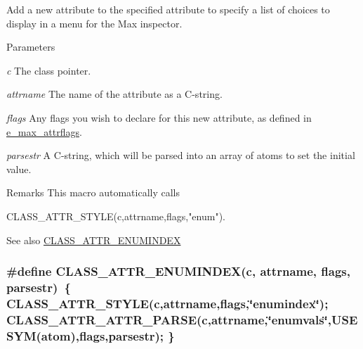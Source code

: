 Add a new attribute to the specified attribute to specify a list of choices to display in a menu for the Max inspector. 
\begin{DoxyParams}{Parameters}
\item[{\em c}]The class pointer. \item[{\em attrname}]The name of the attribute as a C-\/string. \item[{\em flags}]Any flags you wish to declare for this new attribute, as defined in \hyperlink{group__attr_gaf296cfc6741bb19207f6ed8062809115}{e\_\-max\_\-attrflags}. \item[{\em parsestr}]A C-\/string, which will be parsed into an array of atoms to set the initial value.\end{DoxyParams}
\begin{DoxyRemark}{Remarks}
This macro automatically calls 
\begin{DoxyCode}
    CLASS_ATTR_STYLE(c,attrname,flags,"enum").
\end{DoxyCode}

\end{DoxyRemark}
\begin{DoxySeeAlso}{See also}
\hyperlink{group__attr_gad0376b4f50f83ddd560e303330ec6427}{CLASS\_\-ATTR\_\-ENUMINDEX} 
\end{DoxySeeAlso}
\hypertarget{group__attr_gad0376b4f50f83ddd560e303330ec6427}{
\subsubsection[{CLASS\_\-ATTR\_\-ENUMINDEX}]{\setlength{\rightskip}{0pt plus 5cm}\#define CLASS\_\-ATTR\_\-ENUMINDEX(c, \/  attrname, \/  flags, \/  parsestr)~\{ CLASS\_\-ATTR\_\-STYLE(c,attrname,flags,\char`\"{}enumindex\char`\"{}); CLASS\_\-ATTR\_\-ATTR\_\-PARSE(c,attrname,\char`\"{}enumvals\char`\"{},USESYM(atom),flags,parsestr); \}}}
\label{group__attr_gad0376b4f50f83ddd560e303330ec6427}



